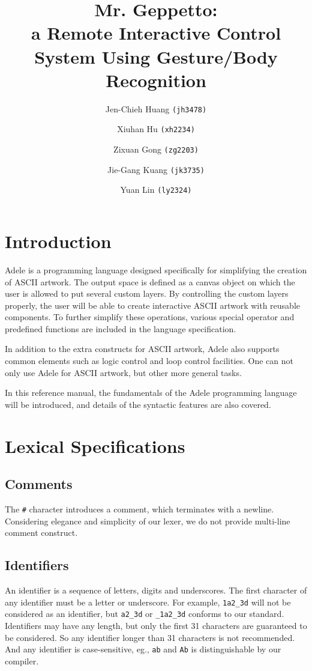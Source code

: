 \documentclass[11pt,letterpaper]{article}
\begin{document}
\title {Mr. Geppetto: \\ 
a Remote Interactive Control System Using Gesture/Body Recognition }
\author {
	Jen-Chieh Huang \texttt{(jh3478)} \and Xiuhan Hu \texttt{(xh2234)} \and     
	Zixuan Gong \texttt{(zg2203)} \and Jie-Gang Kuang \texttt{(jk3735)} \and 
	Yuan Lin \texttt{(ly2324)}
}
\maketitle
\pagebreak
\begin{changemargin}{-0.5cm}{-0.5cm} 
\setcounter{tocdepth}{3}
\tableofcontents
\end{changemargin}
\pagebreak
\section {Introduction}
Adele is a programming language designed specifically for simplifying the creation of ASCII artwork. The output space is defined as a canvas object on which the user is allowed to put several custom layers. By controlling the custom layers properly, the user will be able to create interactive ASCII artwork with reusable components. To further simplify these operations, various special operator and predefined functions are included in the language specification.

In addition to the extra constructs for ASCII artwork, Adele also supports common elements such as logic control and loop control facilities. One can not only use Adele for ASCII artwork, but other more general tasks.

In this reference manual, the fundamentals of the Adele programming language will be introduced, and details of the syntactic features are also covered.

\section {Lexical Specifications}
\subsection {Comments}
The \texttt{\#} character introduces a comment, which terminates with a newline. Considering elegance and simplicity of our lexer, we do not provide multi-line comment construct. 

\subsection {Identifiers}
An identifier is a sequence of letters, digits and underscores. The first character of any identifier must be a letter or underscore. For example, \texttt {1a2\_3d} will not be considered as an identifier, but \texttt{a2\_3d} or \texttt{\_1a2\_3d} conforms to our standard. Identifiers may have any length, but only the first 31 characters are guaranteed to be considered. So any identifier longer than 31 characters is not recommended. And any identifier is case-sensitive, eg., \texttt{ab} and \texttt{Ab} is distinguishable by our compiler.
\end{document}
